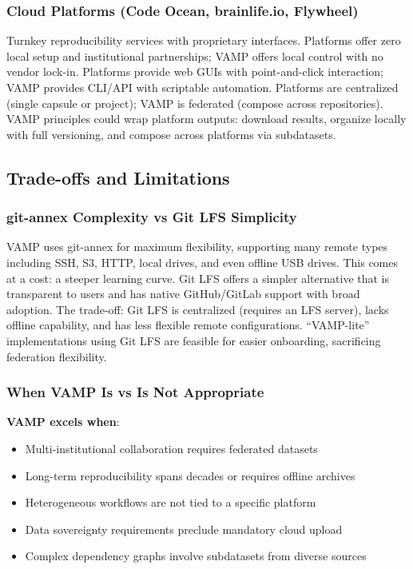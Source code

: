 \documentclass{article}
\begin{document}
\subsubsection{Cloud Platforms (Code Ocean, brainlife.io, Flywheel)}
Turnkey reproducibility services with proprietary interfaces.
Platforms offer zero local setup and institutional partnerships; VAMP offers local control with no vendor lock-in.
Platforms provide web GUIs with point-and-click interaction; VAMP provides CLI/API with scriptable automation.
Platforms are centralized (single capsule or project); VAMP is federated (compose across repositories).
VAMP principles could wrap platform outputs: download results, organize locally with full versioning, and compose across platforms via subdatasets.

\subsection{Trade-offs and Limitations}

\subsubsection{git-annex Complexity vs Git LFS Simplicity}
VAMP uses git-annex for maximum flexibility, supporting many remote types including SSH, S3, HTTP, local drives, and even offline USB drives.
This comes at a cost: a steeper learning curve.
Git LFS offers a simpler alternative that is transparent to users and has native GitHub/GitLab support with broad adoption.
The trade-off: Git LFS is centralized (requires an LFS server), lacks offline capability, and has less flexible remote configurations.
``VAMP-lite'' implementations using Git LFS are feasible for easier onboarding, sacrificing federation flexibility.

\subsubsection{When VAMP Is vs Is Not Appropriate}

\textbf{VAMP excels when}:
\begin{itemize}
    \item Multi-institutional collaboration requires federated datasets
    \item Long-term reproducibility spans decades or requires offline archives
    \item Heterogeneous workflows are not tied to a specific platform
    \item Data sovereignty requirements preclude mandatory cloud upload
    \item Complex dependency graphs involve subdatasets from diverse sources
\end{itemize}
\end{document}
